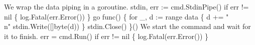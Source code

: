 \nwendcode{}\nwdocspar
We wrap the data piping in a goroutine.
\nwenddocs{}\endmoddef\nwstartdeflinemarkup{}\nwenddeflinemarkup
stdin, err := cmd.StdinPipe()
if err != nil \{ log.Fatal(err.Error()) \}
go func() \{
          for _, d := range data \{
                  d += "\\n"
                  stdin.Write([]byte(d))
          \}
          stdin.Close()
\}()
\nwendcode{}\nwdocspar
We start the command and wait for it to finish.
\nwenddocs{}\endmoddef\nwstartdeflinemarkup{}\nwenddeflinemarkup
err = cmd.Run()
if err != nil \{
          log.Fatal(err.Error())
\}
\nwendcode{}

